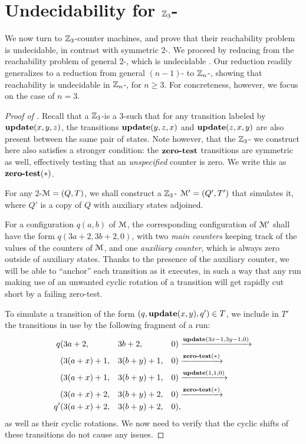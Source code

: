 \section{Undecidability for $\mathbb{Z}_{3}$-} \label{sec:undecid}

We now turn to $\mathbb{Z}_{3}$-counter machines, and prove that their reachability
problem is undecidable, in contrast with symmetric 2-.
We proceed by reducing from the reachability problem of general 2-,
which is undecidable \cite{Minsky67}.
Our reduction readily generalizes to a reduction from general $(n-1)$-
to $\mathbb{Z}_{n}$-, showing that reachability is undecidable
in $\mathbb{Z}_{n}$-, 
for $n \geq 3$. For concreteness, however, we focus
on the case of $n = 3$.

\begin{proof}[Proof of ]
Recall that a $\mathbb{Z}_{3}$-\cm is a 3-\cm such that
for any transition labeled by $\textbf{update}(x,y,z)$, the transitions
$\textbf{update}(y,z,x)$ and $\textbf{update}(z,x,y)$ are also present
between the same pair of states. Note however, that the $\mathbb{Z}_{3}$-\cm
we construct here also satisfies a stronger condition:
the $\textbf{zero-test}$ transitions are symmetric as well, effectively testing
that an \emph{unspecified} counter is zero. We write this as
$\textbf{zero-test}(\ast)$.

For any 2-\cm $\mathcal{M} = (Q, T)$, we shall construct a $\mathbb{Z}_{3}$-\cm
$\mathcal{M}' = (Q', T')$ that simulates it,
where $Q'$ is a copy of $Q$ with auxiliary states adjoined.

For a configuration $q(a, b)$ of $\mathcal{M}$, the corresponding configuration
of $\mathcal{M}'$ shall have the form $q(3a+2, 3b+2, 0)$,
with two \emph{main counters} keeping track of the values
of the counters of $\mathcal{M}$,
and one \emph{auxiliary counter}, which is always zero outside of
auxiliary states.
Thanks to the presence of the auxiliary counter,
we will be able to ``anchor'' each transition as it executes,
in such a way that any run making use of an unwanted cyclic rotation
of a transition
will get rapidly cut short by a failing zero-test.

To simulate a transition of the form $(q, \textbf{update}(x, y), q') \in T$,
we include in $T'$ the transitions in use by the following fragment of a run:
\[ \begin{split}
    q&(3a + 2, && 3b + 2, && 0)
    \xrightarrow{\textbf{update}(3x - 1, 3y - 1, 0)} \\
    &(3(a + x) + 1, && 3(b + y) + 1, && 0)
    \xrightarrow{\textbf{zero-test}(\ast)} \\
    &(3(a + x) + 1, && 3(b + y) + 1, && 0)
    \xrightarrow{\textbf{update}(1, 1, 0)} \\
    &(3(a + x) + 2, && 3(b + y) + 2, && 0)
    \xrightarrow{\textbf{zero-test}(\ast)} \\
    q'&(3(a + x) + 2, && 3(b + y) + 2, && 0),
\end{split} \]
as well as their cyclic rotations.
We now need to verify that the cyclic shifts of these transitions
do not cause any issues.


\end{proof}
